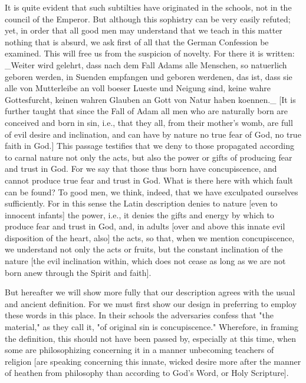 It is quite evident that such subtilties have originated in the
schools, not in the council of the Emperor.  But although this
sophistry can be very easily refuted; yet, in order that all good men
may understand that we teach in this matter nothing that is absurd,
we ask first of all that the German Confession be examined.  This
will free us from the suspicion of novelty.  For there it is written:
_Weiter wird gelehrt, dass nach dem Fall Adams alle Menschen, so
natuerlich geboren werden, in Suenden empfangen und geboren werdenen,
das ist, dass sie alle von Mutterleibe an voll boeser Lueste und
Neigung sind, keine wahre Gottesfurcht, keinen wahren Glauben an Gott
von Natur haben koennen._ [It is further taught that since the Fall
of Adam all men who are naturally born are conceived and born in sin,
i.e., that they all, from their mother's womb, are full of evil
desire and inclination, and can have by nature no true fear of God,
no true faith in God.] This passage testifies that we deny to those
propagated according to carnal nature not only the acts, but also the
power or gifts of producing fear and trust in God.  For we say that
those thus born have concupiscence, and cannot produce true fear and
trust in God.  What is there here with which fault can be found?  To
good men, we think, indeed, that we have exculpated ourselves
sufficiently.  For in this sense the Latin description denies to
nature [even to innocent infants] the power, i.e., it denies the
gifts and energy by which to produce fear and trust in God, and, in
adults [over and above this innate evil disposition of the heart,
also] the acts, so that, when we mention concupiscence, we understand
not only the acts or fruits, but the constant inclination of the
nature [the evil inclination within, which does not cease as long as
we are not born anew through the Spirit and faith].

But hereafter we will show more fully that our description agrees
with the usual and ancient definition.  For we must first show our
design in preferring to employ these words in this place.  In their
schools the adversaries confess that "the material," as they call it,
"of original sin is concupiscence." Wherefore, in framing the
definition, this should not have been passed by, especially at this
time, when some are philosophizing concerning it in a manner
unbecoming teachers of religion [are speaking concerning this innate,
wicked desire more after the manner of heathen from philosophy than
according to God's Word, or Holy Scripture].

